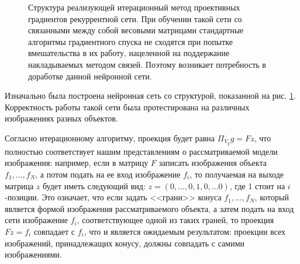 \documentclass[a4paper, 12pt]{article}
\begin{document}
\begin{figure}[htb!]
\centering
{} 
\caption{Структура реализующей итерационный метод проективных градиентов рекуррентной сети. При обучении такой сети со связанными между собой весовыми матрицами стандартные алгоритмы градиентного спуска не сходятся при попытке вмешательства в их работу, нацеленной на поддержание накладываемых методом связей. Поэтому возникает потребность в доработке данной нейронной сети.}
\label{first_rnn}
\end{figure}
Изначально была построена нейронная сеть со структурой, показанной на рис. \ref{first_rnn}. Корректность работы такой сети была протестирована на различных изображениях разных объектов. 

Согласно итерационному алгоритму, проекция будет равна $\Pi_{V_g} g = F z$, что полностью соответствует нашим представлениям о рассматриваемой модели изображения: например, если в матрицу $F$ записать изображения объекта $f_1,...,f_N$, а потом подать на ее вход изображение $f_i$, то получаемая на выходе матрица $z$ будет иметь следующий вид: $z = (0, ..., 0, 1, 0, ...0)$, где 1 стоит на $i$-позиции. Это означает, что если задать <<грани>> конуса $f_1,...,f_N$, который является формой изображения рассматриваемого объекта, а затем подать на вход сети изображение $f_i$, соответствующее одной из таких граней, то проекция $F z = f_i$ совпадает с $f_i$, что и является ожидаемым результатом: проекции всех изображений, принадлежащих конусу, должны совпадать с самими изображениями.
\end{document}
